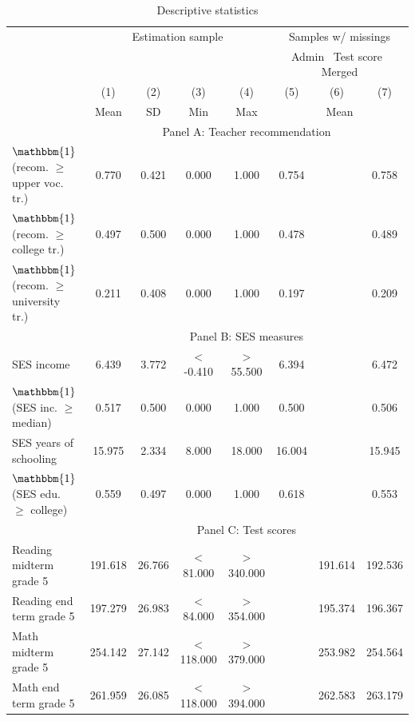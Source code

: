 \begin{table}
\small
\linespread{1.00}
\begin{center}
\caption{Descriptive statistics}
\label{tbl:descrstats}
\begin{tabular}{lcccc|ccc}
\toprule \toprule
&\multicolumn{4}{c}{Estimation sample}&\multicolumn{3}{c}{Samples w/ missings}\\
[-.75em]
&\multicolumn{4}{c}{}&\multicolumn{3}{c}{Admin \, Test score \, Merged}\\ 
&\multicolumn{1}{c}{(1)}&\multicolumn{1}{c}{(2)}&\multicolumn{1}{c}{(3)}&\multicolumn{1}{c}{(4)}&\multicolumn{1}{c}{(5)}&\multicolumn{1}{c}{(6)}&\multicolumn{1}{c}{(7)}\\
[-.50em]
& Mean & SD  & Min & Max & \multicolumn{3}{c}{Mean} \\
\midrule
&\multicolumn{7}{c}{Panel A: Teacher recommendation} \\
$\mathbbm{1}$(recom. $\geq$ upper voc. tr.)&       0.770&       0.421&       0.000&       1.000 &0.754&&0.758 \\
$\mathbbm{1}$(recom. $\geq$ college tr.)&       0.497&       0.500&       0.000&       1.000 &0.478&&0.489\\
$\mathbbm{1}$(recom. $\geq$ university tr.)&       0.211&       0.408&       0.000&       1.000 &0.197&&0.209\\
[.25em]
&\multicolumn{7}{c}{Panel B: SES measures} \\
SES income          &       6.439&       3.772&      $<$-0.410 &      $>$55.500 &6.394&&6.472\\
$\mathbbm{1}$(SES inc. $\geq$ median)&       0.517&       0.500&       0.000&       1.000 &0.500&&0.506\\
SES years of schooling&      15.975&       2.334&       8.000&      18.000 &16.004&&15.945\\
$\mathbbm{1}$(SES edu. $\geq$ college)&       0.559&       0.497&       0.000&       1.000 &0.618&&0.553\\
[.25em]
&\multicolumn{7}{c}{Panel C: Test scores} \\
Reading midterm grade 5     &     191.618&      26.766&      $<$81.000&     $>$340.000 &&191.614&192.536\\
Reading end term grade 5    &     197.279&      26.983&       $< $84.000&      $> $354.000 &&195.374&196.367\\
Math midterm grade 5     &     254.142&      27.142&       $< $118.000&      $> $379.000 &&253.982&254.564\\
Math end term grade 5    &     261.959&      26.085&       $< $118.000&      $>$394.000 &&262.583&263.179\\

\end{tabular}
\end{center}
\end{table}
